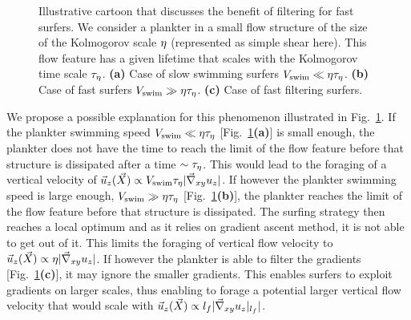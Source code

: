 \begin{figure}
	\centering
	\def\svgwidth{0.8\textwidth}
	
  	\caption[Illustrative cartoon that discusses the benefit of filtering for fast surfers.]{
  		Illustrative cartoon that discusses the benefit of filtering for fast surfers.
  		We consider a plankter in a small flow structure of the size of the Kolmogorov scale $\eta$ (represented as simple shear here). This flow feature has a given lifetime that scales with the Kolmogorov time scale $\tau_{\eta}$.
  		\textbf{(a)} Case of slow swimming surfers $V_{\mathrm{swim}} \ll \eta \tau_{\eta}$.
  		\textbf{(b)} Case of fast surfers $V_{\mathrm{swim}} \gg \eta \tau_{\eta}$.
  		\textbf{(c)} Case of fast filtering surfers.
  	}
  	\label{fig:filtering_surfers}
\end{figure}
We propose a possible explanation for this phenomenon illustrated in Fig.~\ref{fig:filtering_surfers}.
If the plankter swimming speed $V_{\mathrm{swim}} \ll \eta \tau_{\eta}$ [Fig.~\ref{fig:filtering_surfers}\textbf{(a)}] is small enough, the plankter does not have the time to reach the limit of the flow feature before that structure is dissipated after a time $\sim \tau_{\eta}$. 
This would lead to the foraging of a vertical velocity of $\vec{u}_{z}(\vec{X}) \propto V_{\mathrm{swim}} \tau_{\eta} \lvert\vec{\nabla}_{xy} u_{z}\rvert$.
If however the plankter swimming speed is large enough, $V_{\mathrm{swim}} \gg \eta \tau_{\eta}$ [Fig.~\ref{fig:filtering_surfers}\textbf{(b)}], the plankter reaches the limit of the flow feature before that structure is dissipated.
The surfing strategy then reaches a local optimum and as it relies on gradient ascent method, it is not able to get out of it.
This limits the foraging of vertical flow velocity to $\vec{u}_{z}(\vec{X}) \propto \eta \lvert\vec{\nabla}_{xy} u_{z}\rvert$.
If however the plankter is able to filter the gradients [Fig.~\ref{fig:filtering_surfers}\textbf{(c)}], it may ignore the smaller gradients.
This enables surfers to exploit gradients on larger scales, thus enabling to forage a potential larger vertical flow velocity that would scale with $\vec{u}_{z}(\vec{X}) \propto l_{f} \lvert\vec{\nabla}_{xy} u_{z}|_{l_{f}}\rvert$.

